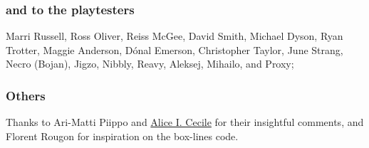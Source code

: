 \begin{multicols}{2}
\subsubsection*{and to the playtesters} Marri Russell, Ross Oliver, Reiss McGee, David Smith, Michael Dyson, Ryan Trotter, Maggie Anderson, 
D\'{o}nal Emerson, Christopher Taylor, June Strang, 
Necro (Bojan), Jigzo, Nibbly, Reavy, 
Aleksej, Mihailo, and Proxy;

\subsubsection*{Others}
Thanks to Ari-Matti Piippo and \href{https://www.twitter.com/AliceICecile}{Alice I. Cecile} for their insightful comments,
and Florent Rougon for inspiration on the box-lines code.

\columnbreak


\end{multicols}

